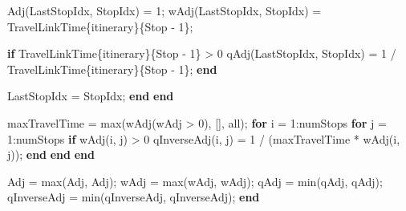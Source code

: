 \documentclass[
  letterpaper,
  DIV=11,
  numbers=noendperiod]{scrartcl}
\newenvironment{Shaded}{\begin{snugshade}}{\end{snugshade}}
\newcommand{\FloatTok}[1]{\textcolor[rgb]{0.68,0.00,0.00}{#1}}
\newcommand{\KeywordTok}[1]{\textcolor[rgb]{0.00,0.23,0.31}{\textbf{#1}}}
\newcommand{\NormalTok}[1]{\textcolor[rgb]{0.00,0.23,0.31}{#1}}
\newcommand{\OperatorTok}[1]{\textcolor[rgb]{0.37,0.37,0.37}{#1}}
\newcommand{\SpecialStringTok}[1]{\textcolor[rgb]{0.13,0.47,0.30}{#1}}
\newcommand{\VariableTok}[1]{\textcolor[rgb]{0.07,0.07,0.07}{#1}}
\begin{document}
\begin{Shaded}
\begin{Highlighting}[]
            \VariableTok{Adj}\NormalTok{(}\VariableTok{LastStopIdx}\OperatorTok{,} \VariableTok{StopIdx}\NormalTok{) }\OperatorTok{=} \FloatTok{1}\OperatorTok{;}
            \VariableTok{wAdj}\NormalTok{(}\VariableTok{LastStopIdx}\OperatorTok{,} \VariableTok{StopIdx}\NormalTok{) }\OperatorTok{=} \VariableTok{TravelLinkTime}\NormalTok{\{}\VariableTok{itinerary}\NormalTok{\}\{}\VariableTok{Stop} \OperatorTok{{-}} \FloatTok{1}\NormalTok{\}}\OperatorTok{;}

            \KeywordTok{if} \VariableTok{TravelLinkTime}\NormalTok{\{}\VariableTok{itinerary}\NormalTok{\}\{}\VariableTok{Stop} \OperatorTok{{-}} \FloatTok{1}\NormalTok{\} }\OperatorTok{\textgreater{}} \FloatTok{0}
                \VariableTok{qAdj}\NormalTok{(}\VariableTok{LastStopIdx}\OperatorTok{,} \VariableTok{StopIdx}\NormalTok{) }\OperatorTok{=} \FloatTok{1} \OperatorTok{/} \VariableTok{TravelLinkTime}\NormalTok{\{}\VariableTok{itinerary}\NormalTok{\}\{}\VariableTok{Stop} \OperatorTok{{-}} \FloatTok{1}\NormalTok{\}}\OperatorTok{;}
            \KeywordTok{end}

            \VariableTok{LastStopIdx} \OperatorTok{=} \VariableTok{StopIdx}\OperatorTok{;}
        \KeywordTok{end}
    \KeywordTok{end}

    \VariableTok{maxTravelTime} \OperatorTok{=} \VariableTok{max}\NormalTok{(}\VariableTok{wAdj}\NormalTok{(}\VariableTok{wAdj} \OperatorTok{\textgreater{}} \FloatTok{0}\NormalTok{)}\OperatorTok{,}\NormalTok{ []}\OperatorTok{,} \SpecialStringTok{\textquotesingle{}all\textquotesingle{}}\NormalTok{)}\OperatorTok{;}
    \KeywordTok{for} \VariableTok{i} \OperatorTok{=} \FloatTok{1}\OperatorTok{:}\VariableTok{numStops}
        \KeywordTok{for} \VariableTok{j} \OperatorTok{=} \FloatTok{1}\OperatorTok{:}\VariableTok{numStops}
            \KeywordTok{if} \VariableTok{wAdj}\NormalTok{(}\VariableTok{i}\OperatorTok{,} \VariableTok{j}\NormalTok{) }\OperatorTok{\textgreater{}} \FloatTok{0}
                \VariableTok{qInverseAdj}\NormalTok{(}\VariableTok{i}\OperatorTok{,} \VariableTok{j}\NormalTok{) }\OperatorTok{=} \FloatTok{1} \OperatorTok{/}\NormalTok{ (}\VariableTok{maxTravelTime} \OperatorTok{*} \VariableTok{wAdj}\NormalTok{(}\VariableTok{i}\OperatorTok{,} \VariableTok{j}\NormalTok{))}\OperatorTok{;}
            \KeywordTok{end}
        \KeywordTok{end}
    \KeywordTok{end}

    \VariableTok{Adj} \OperatorTok{=} \VariableTok{max}\NormalTok{(}\VariableTok{Adj}\OperatorTok{,} \VariableTok{Adj}\OperatorTok{\textquotesingle{}}\NormalTok{)}\OperatorTok{;}
    \VariableTok{wAdj} \OperatorTok{=} \VariableTok{max}\NormalTok{(}\VariableTok{wAdj}\OperatorTok{,} \VariableTok{wAdj}\OperatorTok{\textquotesingle{}}\NormalTok{)}\OperatorTok{;}
    \VariableTok{qAdj} \OperatorTok{=} \VariableTok{min}\NormalTok{(}\VariableTok{qAdj}\OperatorTok{,} \VariableTok{qAdj}\OperatorTok{\textquotesingle{}}\NormalTok{)}\OperatorTok{;}
    \VariableTok{qInverseAdj} \OperatorTok{=} \VariableTok{min}\NormalTok{(}\VariableTok{qInverseAdj}\OperatorTok{,} \VariableTok{qInverseAdj}\OperatorTok{\textquotesingle{}}\NormalTok{)}\OperatorTok{;}
\KeywordTok{end}
\end{Highlighting}
\end{Shaded}
\end{document}
